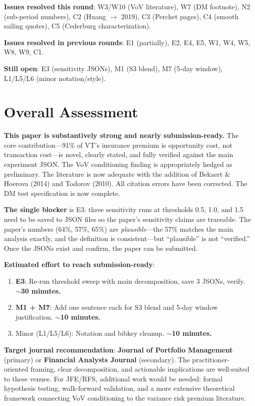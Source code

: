 \documentclass[12pt,a4paper]{article}
\begin{document}
\textbf{Issues resolved this round}: W3/W10 (VoV literature), W7 (DM footnote), N2 (sub-period numbers), C2 (Huang $\to$ 2019), C3 (Perchet pages), C4 (smooth sailing quotes), C5 (Cederburg characterization).

\textbf{Issues resolved in previous rounds}: E1 (partially), E2, E4, E5, W1, W4, W5, W8, W9, C1.

\textbf{Still open}: E3 (sensitivity JSONs), M1 (S3 blend), M7 (5-day window), L1/L5/L6 (minor notation/style).

\section*{Overall Assessment}

\textbf{This paper is substantively strong and nearly submission-ready.} The core contribution---91\% of VT's insurance premium is opportunity cost, not transaction cost---is novel, clearly stated, and fully verified against the main experiment JSON. The VoV conditioning finding is appropriately hedged as preliminary. The literature is now adequate with the addition of Bekaert \& Hoerova (2014) and Todorov (2010). All citation errors have been corrected. The DM test specification is now complete.

\textbf{The single blocker} is E3: three sensitivity runs at thresholds 0.5, 1.0, and 1.5 need to be saved to JSON files so the paper's sensitivity claims are traceable. The paper's numbers (64\%, 57\%, 65\%) are \emph{plausible}---the 57\% matches the main analysis exactly, and the definition is consistent---but ``plausible'' is not ``verified.'' Once the JSONs exist and confirm, the paper can be submitted.

\textbf{Estimated effort to reach submission-ready}:
\begin{enumerate}
\item \textcolor{errorred}{\textbf{E3}}: Re-run threshold sweep with main decomposition, save 3 JSONs, verify. \textbf{$\sim$30 minutes.}
\item \textcolor{warncolor}{\textbf{M1 + M7}}: Add one sentence each for S3 blend and 5-day window justification. \textbf{$\sim$10 minutes.}
\item Minor (L1/L5/L6): Notation and bibkey cleanup. \textbf{$\sim$10 minutes.}
\end{enumerate}

\textbf{Target journal recommendation}: \textbf{Journal of Portfolio Management} (primary) or \textbf{Financial Analysts Journal} (secondary). The practitioner-oriented framing, clear decomposition, and actionable implications are well-suited to these venues. For JFE/RFS, additional work would be needed: formal hypothesis testing, walk-forward validation, and a more extensive theoretical framework connecting VoV conditioning to the variance risk premium literature.
\end{document}
